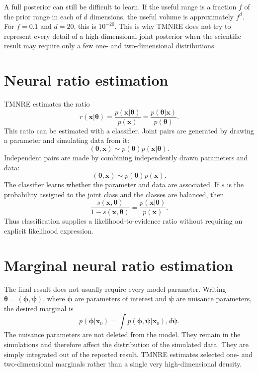 ﻿\documentclass[11pt,a4paper]{article}
\begin{document}
A full posterior can still be difficult to learn. If the useful range is a fraction $f$ of the prior range in each of $d$ dimensions, the useful volume is approximately $f^d$. For $f=0.1$ and $d=20$, this is $10^{-20}$. This is why TMNRE does not try to represent every detail of a high-dimensional joint posterior when the scientific result may require only a few one- and two-dimensional distributions.

\section{Neural ratio estimation}
TMNRE estimates the ratio
\begin{equation}
r(\bm{x}|\bm{\theta})=
\frac{p(\bm{x}|\bm{\theta})}{p(\bm{x})}
=\frac{p(\bm{\theta}|\bm{x})}{p(\bm{\theta})}.
\end{equation}
This ratio can be estimated with a classifier. Joint pairs are generated by drawing a parameter and simulating data from it:
\[
(\bm{\theta},\bm{x})\sim p(\bm{\theta})p(\bm{x}|\bm{\theta}).
\]
Independent pairs are made by combining independently drawn parameters and data:
\[
(\bm{\theta},\bm{x})\sim p(\bm{\theta})p(\bm{x}).
\]
The classifier learns whether the parameter and data are associated. If $s$ is the probability assigned to the joint class and the classes are balanced, then
\begin{equation}
\frac{s(\bm{x},\bm{\theta})}{1-s(\bm{x},\bm{\theta})}
=\frac{p(\bm{x}|\bm{\theta})}{p(\bm{x})}.
\end{equation}
Thus classification supplies a likelihood-to-evidence ratio without requiring an explicit likelihood expression.

\section{Marginal neural ratio estimation}
The final result does not usually require every model parameter. Writing $\bm{\theta}=(\bm{\phi},\bm{\psi})$, where $\bm{\phi}$ are parameters of interest and $\bm{\psi}$ are nuisance parameters, the desired marginal is
\begin{equation}
p(\bm{\phi}|\bm{x}_0)=\int p(\bm{\phi},\bm{\psi}|\bm{x}_0),d\bm{\psi}.
\end{equation}
The nuisance parameters are not deleted from the model. They remain in the simulations and therefore affect the distribution of the simulated data. They are simply integrated out of the reported result. TMNRE estimates selected one- and two-dimensional marginals rather than a single very high-dimensional density.
\end{document}
